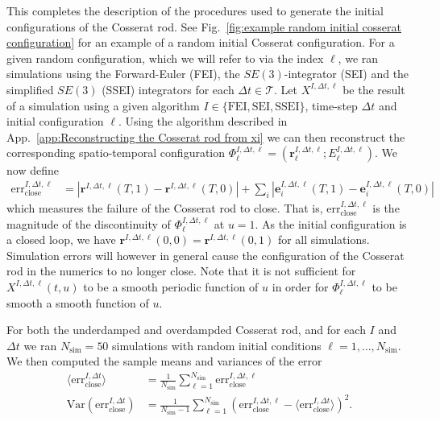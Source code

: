 \documentclass[withindex,glossary,techreport]{cam-thesis}
\begin{document}
\begin{appendices}
This completes the description of the procedures used to generate the initial configurations of the Cosserat rod. See Fig.~\ref{fig:example random initial cosserat configuration} for an example of a random initial Cosserat configuration. For a given random configuration, which we will refer to via the index $\ell$, we ran simulations using the Forward-Euler (FEI), the $SE(3)$-integrator (SEI) and the simplified $SE(3)$ (SSEI) integrators for each $\Delta t \in \mathcal{T}$. Let $X^{I,\Delta t,\ell}$ be the result of a simulation using a given algorithm $I \in \{ \text{FEI}, \text{SEI}, \text{SSEI} \}$, time-step $\Delta t$ and initial configuration $\ell$. Using the algorithm described in App.~\ref{app:Reconstructing the Cosserat rod from xi} we can then reconstruct the corresponding spatio-temporal configuration $\Phi_\ell^{I,\Delta t,\ell} = (\mathbf{r}_\ell^{I, \Delta t,\ell} ; E_\ell^{I, \Delta t,\ell})$. We now define
\begin{subequations}
	\begin{align}
		\text{err}_\text{close}^{I, \Delta t, \ell} & = 
			|\mathbf{r}^{I, \Delta t, \ell}(T, 1) - \mathbf{r}^{I, \Delta t, \ell}(T, 0)|
			+ \sum_i |\mathbf{e}_i^{I, \Delta t, \ell}(T, 1) - \mathbf{e}_i^{I, \Delta t, \ell}(T, 0)|   \label{eq:cosserat close error}
	\end{align}
\end{subequations}
which measures the failure of the Cosserat rod to close. That is, $\text{err}_\text{close}^{I, \Delta t, \ell}$ is the magnitude of the discontinuity of $\Phi_\ell^{I,\Delta t,\ell}$ at $u=1$. As the initial configuration is a closed loop, we have $\mathbf{r}^{I, \Delta t, \ell}(0, 0) = \mathbf{r}^{I, \Delta t, \ell}(0, 1)$ for all simulations. Simulation errors will however in general cause the configuration of the Cosserat rod in the numerics to no longer close. Note that it is not sufficient for $X^{I,\Delta t,\ell}(t,u)$ to be a smooth periodic function of $u$ in order for $\Phi_\ell^{I,\Delta t,\ell}$ to be smooth a smooth function of $u$.

For both the underdamped and overdampded Cosserat rod, and for each $I$ and $\Delta t$ we ran $N_\text{sim} = 50$ simulations with random initial conditions $\ell = 1,\dots, N_\text{sim}$. We then computed the sample means and variances of the error
\begin{subequations}
	\begin{align}
		\langle \text{err}_\text{close}^{I, \Delta t} \rangle & = \frac{1}{N_\text{sim}} \sum_{\ell = 1}^{N_\text{sim}} \text{err}_\text{close}^{I, \Delta t, \ell} \\
		\text{Var}( \text{err}_\text{close}^{I, \Delta t}) & = \frac{1}{N_\text{sim}-1} \sum_{\ell = 1}^{N_\text{sim}} ( \text{err}_\text{close}^{I, \Delta t, \ell} - \langle \text{err}_\text{close}^{I, \Delta t} \rangle)^2.
	\end{align}
\end{subequations}


\end{appendices}
\end{document}

